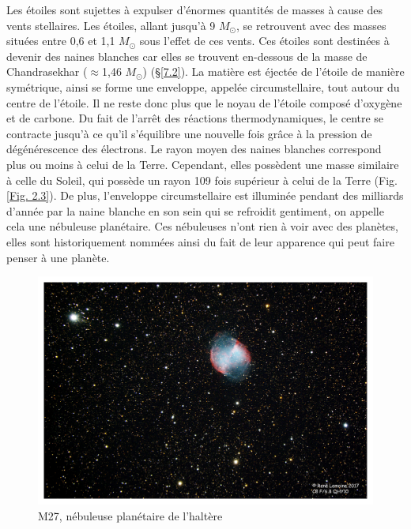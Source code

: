 Les étoiles sont sujettes à expulser d’énormes quantités de masses à cause des vents stellaires. Les étoiles, allant jusqu’à 9 $M_\odot$, se retrouvent avec des masses situées entre 0,6 et 1,1 $M_\odot$ sous l’effet de ces vents. Ces étoiles sont destinées à devenir des naines blanches car elles se trouvent en-dessous de la masse de Chandrasekhar ($\approx$1,46 $M_\odot$) (§\ref{7.2}). La matière est éjectée de l’étoile de manière symétrique, ainsi se forme une enveloppe, appelée circumstellaire, tout autour du centre de l’étoile. Il ne reste donc plus que le noyau de l’étoile composé d’oxygène et de carbone. Du fait de l’arrêt des réactions thermodynamiques, le centre se contracte jusqu’à ce qu’il s’équilibre une nouvelle fois grâce à la pression de dégénérescence des électrons. Le rayon moyen des naines blanches correspond plus ou moins à celui de la Terre. Cependant, elles possèdent une masse similaire à celle du Soleil, qui possède un rayon 109 fois supérieur à celui de la Terre (Fig. \ref{Fig. 2.3}). De plus, l’enveloppe circumstellaire est illuminée pendant des milliards d’année par la naine blanche en son sein qui se refroidit gentiment, on appelle cela une nébuleuse planétaire. Ces nébuleuses n’ont rien à voir avec des planètes, elles sont historiquement nommées ainsi du fait de leur apparence qui peut faire penser à une planète.\newpage 

\begin{figure}[H]\vspace{1cm}
	\centering
	\includegraphics[scale=0.4]{images/m27}
	\caption[M27, nébuleuse planétaire de l'haltère - astrophoto prise par René Lemoine le 30 juillet 2017 avec un Celestron 8 (1h50 de pose)]{M27, nébuleuse planétaire de l'haltère}
	\label{Fig. 2.5}
\end{figure}  

